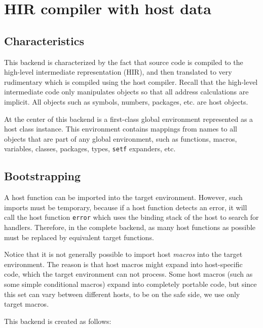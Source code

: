 \chapter{HIR compiler with host data}

\section{Characteristics}

This backend is characterized by the fact that source code is compiled
to the high-level intermediate representation (HIR), and then
translated to very rudimentary \commonlisp{} which is compiled using
the host compiler.  Recall that the high-level intermediate code only
manipulates \commonlisp{} objects so that all address calculations are
implicit.  All objects such as symbols, numbers, packages, etc. are
host objects.

At the center of this backend is a \sysname{} first-class global
environment represented as a host class instance.  This environment
contains mappings from names to all objects that are part of any
global environment, such as functions, macros, variables, classes,
packages, types, \texttt{setf} expanders, etc.

\section{Bootstrapping}

A host function can be imported into the target environment.  However,
such imports must be temporary, because if a host function detects an
error, it will call the host function \texttt{error} which uses the
binding stack of the host to search for handlers.  Therefore, in the
complete backend, as many host functions as possible must be replaced
by equivalent target functions.

Notice that it is not generally possible to import host \emph{macros}
into the target environment.  The reason is that host macros might
expand into host-specific code, which the target environment can not
process.  Some host macros (such as some simple conditional macros)
expand into completely portable code, but since this set can vary
between different hosts, to be on the safe side, we use only target
macros.

This backend is created as follows:

